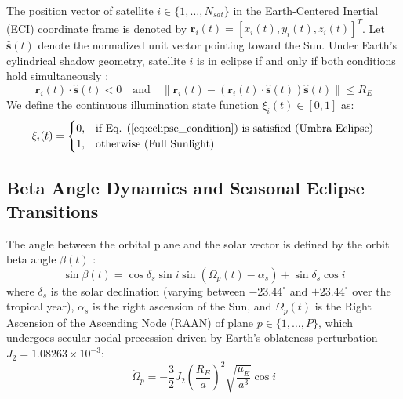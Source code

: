 \documentclass[journal]{IEEEtran}
\begin{document}
The position vector of satellite $i \in \{1, \dots, N_{sat}\}$ in the Earth-Centered Inertial (ECI) coordinate frame is denoted by $\mathbf{r}_i(t) = [x_i(t), y_i(t), z_i(t)]^T$. Let $\hat{\mathbf{s}}(t)$ denote the normalized unit vector pointing toward the Sun. Under Earth's cylindrical shadow geometry, satellite $i$ is in eclipse if and only if both conditions hold simultaneously \cite{patel2005spacecraft, wertz2011space}:
\begin{equation}
    \mathbf{r}_i(t) \cdot \hat{\mathbf{s}}(t) < 0 \quad \text{and} \quad \|\mathbf{r}_i(t) - (\mathbf{r}_i(t) \cdot \hat{\mathbf{s}}(t))\hat{\mathbf{s}}(t)\| \le R_E
    \label{eq:eclipse_condition}
\end{equation}
We define the continuous illumination state function $\xi_i(t) \in [0, 1]$ as:
\begin{equation}
    \xi_i(t) = 
    \begin{cases}
        0, & \text{if Eq. (\ref{eq:eclipse_condition}) is satisfied (Umbra Eclipse)} \\
        1, & \text{otherwise (Full Sunlight)}
    \end{cases}
    \label{eq:illumination_state}
\end{equation}

\subsection{Beta Angle Dynamics and Seasonal Eclipse Transitions}
The angle between the orbital plane and the solar vector is defined by the orbit beta angle $\beta(t)$ \cite{patel2005spacecraft, curtis2014orbital, wertz2011space}:
\begin{equation}
    \sin \beta(t) = \cos \delta_s \sin i \sin(\Omega_p(t) - \alpha_s) + \sin \delta_s \cos i
    \label{eq:beta_angle}
\end{equation}
where $\delta_s$ is the solar declination (varying between $-23.44^\circ$ and $+23.44^\circ$ over the tropical year), $\alpha_s$ is the right ascension of the Sun, and $\Omega_p(t)$ is the Right Ascension of the Ascending Node (RAAN) of plane $p \in \{1, \dots, P\}$, which undergoes secular nodal precession driven by Earth's oblateness perturbation $J_2 = 1.08263 \times 10^{-3}$:
\begin{equation}
    \dot{\Omega}_p = -\frac{3}{2} J_2 \left(\frac{R_E}{a}\right)^2 \sqrt{\frac{\mu_E}{a^3}} \cos i
    \label{eq:nodal_precession}
\end{equation}
\end{document}
